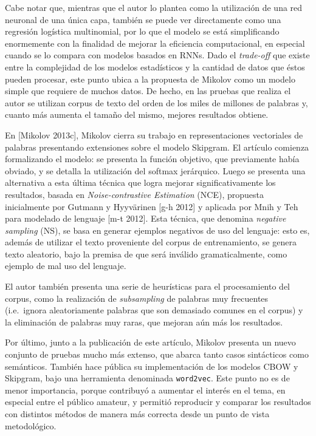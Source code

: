 Cabe notar que, mientras que el autor lo plantea como la utilización de una red neuronal de una
única capa, también se puede ver directamente como una regresión logística multinomial, por lo que
el modelo se está simplificando enormemente con la finalidad de mejorar la eficiencia computacional,
en especial cuando se lo compara con modelos basados en RNNs. Dado el \textit{trade-off} que existe
entre la complejidad de los modelos estadísticos y la cantidad de datos que éstos pueden procesar,
este punto ubica a la propuesta de Mikolov como un modelo simple que requiere de muchos datos. De
hecho, en las pruebas que realiza el autor se utilizan corpus de texto del orden de los miles de
millones de palabras y, cuanto más aumenta el tamaño del mismo, mejores resultados obtiene.

En [Mikolov 2013c], Mikolov cierra su trabajo en representaciones vectoriales de palabras
presentando extensiones sobre el modelo Skipgram. El artículo comienza formalizando el modelo: se
presenta la función objetivo, que previamente había obviado, y se detalla la utilización del softmax
jerárquico. Luego se presenta una alternativa a esta última técnica que logra mejorar
significativamente los resultados, basada en \textit{Noise-contrastive Estimation} (NCE), propuesta
inicialmente por Gutmann y Hyyvärinen [g-h 2012] y aplicada por Mnih y Teh para modelado de lenguaje
[m-t 2012]. Esta técnica, que denomina \textit{negative sampling} (NS), se basa en generar ejemplos
negativos de uso del lenguaje: esto es, además de utilizar el texto proveniente del corpus de
entrenamiento, se genera texto aleatorio, bajo la premisa de que será inválido gramaticalmente, como
ejemplo de mal uso del lenguaje.

El autor también presenta una serie de heurísticas para el procesamiento del corpus, como la
realización de \textit{subsampling} de palabras muy frecuentes (i.e.\ ignora aleatoriamente palabras que
son demasiado comunes en el corpus) y la eliminación de palabras muy raras, que mejoran aún más los
resultados.

Por último, junto a la publicación de este artículo, Mikolov presenta un nuevo conjunto de pruebas
mucho más extenso, que abarca tanto casos sintácticos como semánticos. También hace pública su
implementación de los modelos CBOW y Skipgram, bajo una herramienta denominada
\texttt{word2vec}. Este punto no es de menor importancia, porque contribuyó a aumentar el interés en
el tema, en especial entre el público amateur, y permitió reproducir y comparar los resultados con
distintos métodos de manera más correcta desde un punto de vista metodológico.


